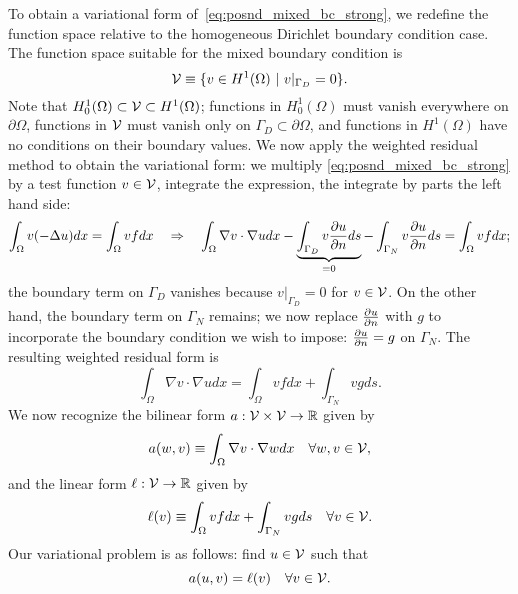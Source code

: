 To obtain a variational form of~\eqref{eq:posnd_mixed_bc_strong},  we redefine the function space relative to the homogeneous Dirichlet boundary condition case.  The function space suitable for the mixed boundary condition is
\begin{equation}
  \mathcal{V} \equiv \{ v \in H^1(\Omega) \ | \ v|_{\Gamma_D} = 0 \}.
  \label{eq:posnd_mixed_bc_space}
\end{equation}
Note that $H^1_0(\Omega) \subset \mathcal{V} \subset H^1(\Omega)$; functions in $H^1_0(\Omega)$ must vanish everywhere on $\partial \Omega$, functions in $\mathcal{V}$ must vanish only on $\Gamma_D \subset \partial \Omega$, and functions in $H^1(\Omega)$ have no conditions on their boundary values. We now apply the weighted residual method to obtain the variational form: we multiply \eqref{eq:posnd_mixed_bc_strong} by a test function $v \in \mathcal{V}$, integrate the expression, the integrate by parts the left hand side:
\begin{equation*}
  \int_\Omega v (-\Delta u) dx = \int_\Omega v f dx
  \quad \Rightarrow \quad
  \int_\Omega \nabla v \cdot \nabla u dx
  - \underbrace{\int_{\Gamma_D} v \frac{\partial u}{\partial n} ds}_{= 0}
  - \int_{\Gamma_N} v \frac{\partial u}{\partial n} ds
  =
  \int_{\Omega} v f dx;
\end{equation*}
the boundary term on $\Gamma_D$ vanishes because $v|_{\Gamma_D} = 0$ for $v \in \mathcal{V}$. On the other hand, the boundary term on $\Gamma_N$ remains; we now replace $\frac{\partial u}{\partial n}$ with $g$ to incorporate the boundary condition we wish to impose: $\frac{\partial u}{\partial n} = g$ on $\Gamma_N$. The resulting weighted residual form is
\begin{equation*}
  \int_\Omega \nabla v \cdot \nabla u dx
  =
  \int_{\Omega} v f dx
  + \int_{\Gamma_N} v g ds.
\end{equation*}
We now recognize the bilinear form $a: \mathcal{V} \times \mathcal{V} \to \mathbb{R}$ given by
\begin{equation*}
  a(w,v) \equiv \int_\Omega \nabla v \cdot \nabla w dx \quad \forall w,v \in \mathcal{V},
\end{equation*}
and the linear form $\ell: \mathcal{V} \to \mathbb{R}$ given by
\begin{equation*}
  \ell(v) \equiv \int_\Omega v f dx + \int_{\Gamma_N} v g ds \quad \forall v \in \mathcal{V}.
\end{equation*}
Our variational problem is as follows: find $u \in \mathcal{V}$ such that
\begin{equation}
  a(u,v) = \ell(v) \quad \forall v \in \mathcal{V}. \label{eq:posnd_mixed_bc_weak}
\end{equation}

